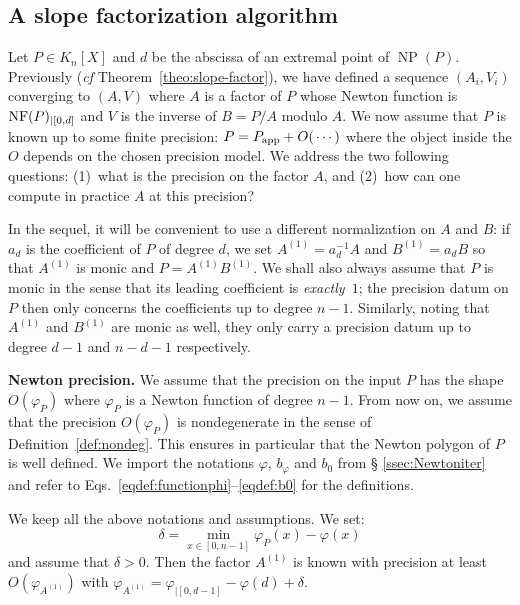\documentclass{sig-alternate-2013}
\DeclareMathOperator{\NP}{NP}
\newcommand{\NF}{\text{\rm NF}}
\newcommand{\app}{\textrm{app}}
\begin{document}
\subsection{A slope factorization algorithm}

Let $P \in K_n[X]$ and $d$ be the abscissa of an extremal point of 
$\NP(P)$. Previously (\emph{cf} Theorem~\ref{theo:slope-factor}), we 
have defined a sequence $(A_i, V_i)$ converging to $(A,V)$ where $A$ is 
a factor of $P$ whose Newton function is $\NF(P)_{|[0,d]}$ and $V$ is the inverse of $B = P/A$ modulo $A$.
We now assume that $P$ is known up to some finite precision: $P = P_\app + 
O(\hspace{0.5mm}\cdots)$ where the object inside the $O$ depends on the 
chosen precision model. We address the two following questions:
(1)~what is the precision on the factor $A$, and
(2)~how can one compute in practice $A$ at this precision?

In the sequel, it will be convenient to use a different normalization on 
$A$ and $B$: if $a_d$ is the coefficient of $P$ of degree $d$, we set
$A^{(1)} = a_d^{-1} A$ and $B^{(1)} = a_d B$
so that $A^{(1)}$ is monic and $P = A^{(1)} B^{(1)}$. We shall also 
always assume that $P$ is monic in the sense that its leading
coefficient is \emph{exactly}~$1$; the precision datum on $P$ then 
only concerns the coefficients up to degree $n{-}1$. Similarly, noting
that $A^{(1)}$ and $B^{(1)}$ are monic as well, they only carry a
precision datum up to degree $d{-}1$ and $n{-}d{-}1$ respectively.

\medskip

\noindent
{\bf Newton precision.}
We assume that the precision on the input $P$ has the shape 
$O(\varphi_P)$ where $\varphi_P$ is a Newton function of degree 
$n{-}1$. From now on, we assume that the precision $O(\varphi_P)$ 
is nondegenerate in the sense of Definition~\ref{def:nondeg}. This
ensures in particular that the Newton polygon of $P$ is well defined. 
We import the notations $\varphi$, $b_\varphi$ and $b_0$ from \S 
\ref{ssec:Newtoniter} and refer to 
Eqs.~\eqref{eqdef:functionphi}--\eqref{eqdef:b0} for the definitions.

\begin{prop}
\label{prop:Newtonprecslope}
We keep all the above notations and assumptions. We set:
$$\delta = \min_{x \in [0,n{-}1]} \varphi_P(x) - \varphi(x)$$
and assume that $\delta > 0$. 
Then the factor $A^{(1)}$ is known with precision at least 
$O(\varphi_{A^{(1)}})$ with
$\varphi_{A^{(1)}} = \varphi_{|[0,d{-}1]} - \varphi(d) + \delta$.
\end{prop}
\end{document}
